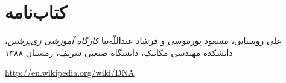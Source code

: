 \section*{کتاب‌نامه}
{} %

\begin{thebibliography}{99} %
\begin{persian}
{}
علی روستایی، مسعود پورموسی و فرشاد عبداللّه‌نیا \emph{کارگاه آموزشی زی‌پرشین}، دانشکده مهندسی مکانیک، دانشگاه صنعتی شریف، زمستان ۱۳۸۸
\end{persian}
\begin{latin}
{}
\url{http://en.wikipedia.org/wiki/DNA}

\end{latin}
\end{thebibliography}